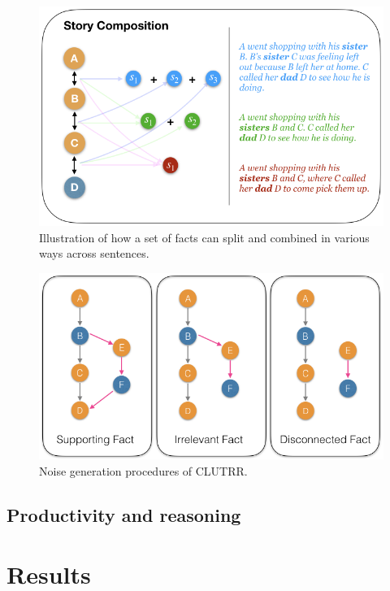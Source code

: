 \documentclass[letterpaper, 12pt]{report}
\begin{document}
\begin{figure}[htbp]
\centering
\includegraphics[height=0.3\textwidth]{figs/clutrr/composition.png}
\caption{Illustration of how a set of facts can split and combined in various ways across sentences.}
\end{figure}

\begin{figure}[htbp]
\centering
\includegraphics[height=0.3\textwidth]{figs/clutrr/clutrr_noise.png}
\caption{Noise generation procedures of CLUTRR.}
\end{figure}

\subsection{Productivity and reasoning}
\label{sec:orgcfb448d}
\section{Results}
\label{sec:org9950ca0}
\end{document}
